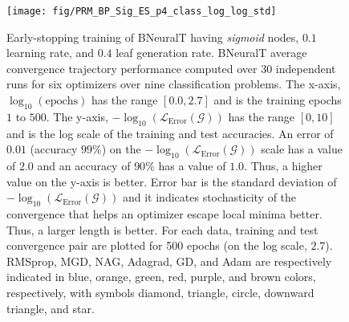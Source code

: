 \documentclass[11pt,a4paper]{article}
\begin{document}
    \begin{figure}
        \centering
        \texttt{[image: fig/PRM\_BP\_Sig\_ES\_p4\_class\_log\_log\_std]}
        \caption{Early-stopping training of BNeuralT having \textit{sigmoid} nodes, $0.1$ learning rate, and $0.4$ leaf generation rate. BNeuralT average convergence trajectory performance computed over 30 independent runs for six optimizers over nine classification problems. The x-axis, $\log_{10}(\mbox{epochs})$ has the range $[0.0, 2.7]$ and is the training epochs $1$ to $500$. The y-axis, $-\log_{10}(\mathcal{L}_{\text{Error}}(\mathcal{G}))$ has the range $[0,10]$ and is the log scale of the training and test  accuracies. An error of $0.01$ (accuracy $99$\%) on the  $-\log_{10}(\mathcal{L}_{\text{Error}}(\mathcal{G}))$ scale has a value of $2.0$ and an accuracy of $90$\% has a value of $1.0$. Thus, a higher value on the y-axis is better. Error bar is the standard deviation of $-\log_{10}(\mathcal{L}_{\text{Error}}(\mathcal{G}))$ and it indicates stochasticity of the convergence that helps an optimizer escape local minima better. Thus, a larger length is better. For each data, training and test convergence pair are plotted for 500 epochs (on the log scale, $2.7$). RMSprop, MGD, NAG, Adagrad, GD, and Adam are respectively indicated in blue, orange, green, red, purple, and brown colors, respectively, with symbols diamond, triangle, circle, downward triangle, and star.}\label{fig:BneuralT_class_covg}
    \end{figure}
    
\end{document}
